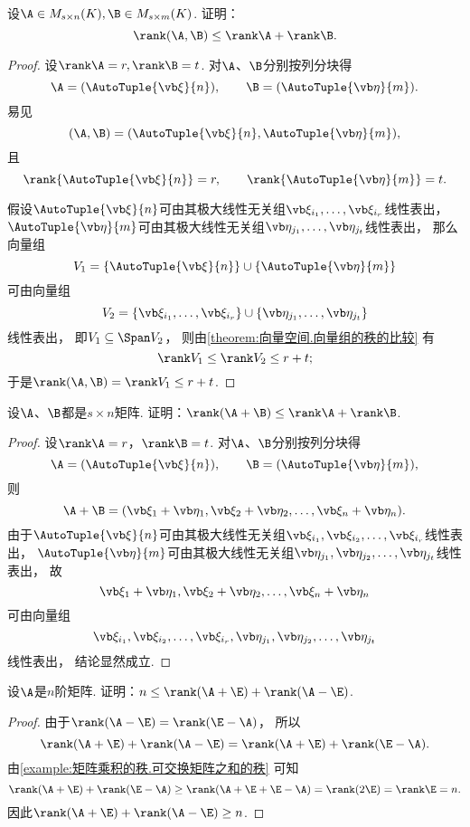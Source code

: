 \begin{example}\label{example:矩阵乘积的秩.分块矩阵的秩的等式2}
设\(\A \in M_{s \times n}(K),
\B \in M_{s \times m}(K)\).
证明：\begin{equation}
	\rank(\A,\B) \leq \rank\A + \rank\B.
\end{equation}
\begin{proof}
\def\as{\AutoTuple{\a}{n}}
\def\bs{\AutoTuple{\b}{m}}
\def\asi{\a_{i_1},\dotsc,\a_{i_r}}
\def\bsj{\b_{j_1},\dotsc,\b_{j_t}}
设\(\rank\A = r,
\rank\B = t\).
对\(\A\)、\(\B\)分别按列分块得\[
	\A = (\as),
	\qquad
	\B = (\bs).
\]
易见\[
	(\A,\B) = (\as,\bs),
\]且\[
	\rank\{\as\} = r,
	\qquad
	\rank\{\bs\} = t.
\]

假设\(\as\)可由其极大线性无关组\(\asi\)线性表出，
\(\bs\)可由其极大线性无关组\(\bsj\)线性表出，
那么向量组\[
	V_1=\{\as\}\cup\{\bs\}
\]可由向量组\[
	V_2=\{\asi\}\cup\{\bsj\}
\]线性表出，
即\(V_1 \subseteq \Span V_2\)，
则由\cref{theorem:向量空间.向量组的秩的比较} 有\[
	\rank V_1
	\leq
	\rank V_2
	\leq
	r+t;
\]
于是\(\rank(\A,\B) = \rank V_1 \leq r+t\).
\end{proof}
\end{example}

\begin{example}
设\(\A\)、\(\B\)都是\(s \times n\)矩阵.
证明：\(\rank(\A+\B) \leq \rank\A + \rank\B\).
\begin{proof}
\def\asi{\a_{i_1},\a_{i_2},\dotsc,\a_{i_r}}
\def\bsj{\b_{j_1},\b_{j_2},\dotsc,\b_{j_t}}
设\(\rank\A = r\)，\(\rank\B = t\).
对\(\A\)、\(\B\)分别按列分块得\[
	\A = (\AutoTuple{\a}{n}), \qquad
	\B = (\AutoTuple{\b}{m}),
\]
则\[
	\A + \B = (\a_1 + \b_1,\a_2 + \b_2,\dotsc,\a_n + \b_n).
\]
由于\(\AutoTuple{\a}{n}\)可由其极大线性无关组\(\asi\)线性表出，
\(\AutoTuple{\b}{m}\)可由其极大线性无关组\(\bsj\)线性表出，
故\[
	\a_1 + \b_1,\a_2 + \b_2,\dotsc,\a_n + \b_n
\]可由向量组\[
	\asi,\bsj
\]线性表出，
结论显然成立.
\end{proof}
\end{example}

\begin{example}\label{example:矩阵乘积的秩.矩阵的一次多项式的秩之和}
设\(\A\)是\(n\)阶矩阵.
证明：\(n \leq \rank(\A + \E) + \rank(\A - \E)\).
\begin{proof}
由于\(\rank(\A - \E) = \rank(\E - \A)\)，
所以\[
	\rank(\A + \E) + \rank(\A - \E)
	= \rank(\A + \E) + \rank(\E - \A).
\]
由\cref{example:矩阵乘积的秩.可交换矩阵之和的秩} 可知\[
	\rank(\A + \E) + \rank(\E - \A)
	\geq \rank(\A + \E + \E - \A)
	= \rank(2\E)
	= \rank\E
	= n.
\]
因此\(\rank(\A + \E) + \rank(\A - \E) \geq n\).
\end{proof}
\end{example}

